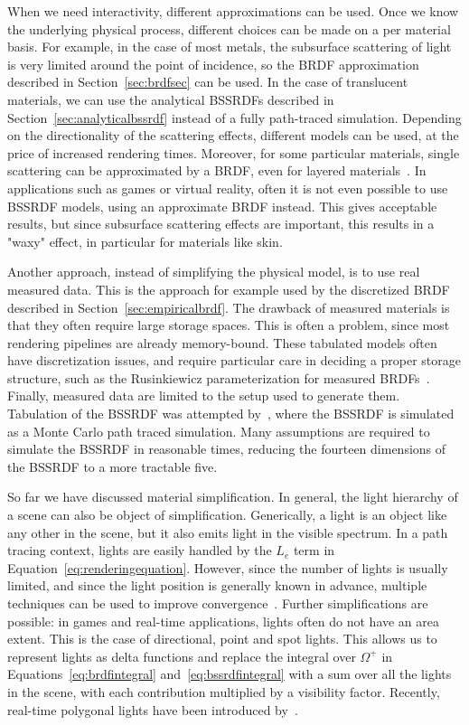 When we need interactivity, different approximations can be used. Once we know the underlying physical process, different choices can be made on a per material basis. For example, in the case of most metals, the subsurface scattering of light is very limited around the point of incidence, so the BRDF approximation described in Section~\ref{sec:brdfsec} can be used. In the case of translucent materials, we can use the analytical BSSRDFs described in Section~\ref{sec:analyticalbssrdf} instead of a fully path-traced simulation. Depending on the directionality of the scattering effects, different models can be used, at the price of increased rendering times. Moreover, for some particular materials, single scattering can be approximated by a BRDF, even for layered materials~\cite{Blinn1982, Hanrahan1993}. In applications such as games or virtual reality, often it is not even possible to use BSSRDF models, using an approximate BRDF instead. This gives acceptable results, but since subsurface scattering effects are important, this results in a "waxy" effect, in particular for materials like skin. 

Another approach, instead of simplifying the physical model, is to use real measured data. This is the approach for example used by the discretized BRDF described in Section~\ref{sec:empiricalbrdf}. The drawback of measured materials is that they often require large storage spaces. This is often a problem, since most rendering pipelines are already memory-bound. These tabulated models often have discretization issues, and require particular care in deciding a proper storage structure, such as the Rusinkiewicz parameterization for measured BRDFs~\cite{Rusinkiewicz1998}. Finally, measured data are limited to the setup used to generate them. Tabulation of the BSSRDF was attempted by~\citet{Donner2009}, where the BSSRDF is simulated as a Monte Carlo path traced simulation. Many assumptions are required to simulate the BSSRDF in reasonable times, reducing the fourteen dimensions of the BSSRDF to a more tractable five.  

So far we have discussed material simplification. In general, the light hierarchy of a scene can also be object of simplification. Generically, a light is an object like any other in the scene, but it also emits light in the visible spectrum. In a path tracing context, lights are easily handled by the $L_e$ term in Equation~\ref{eq:renderingequation}. However, since the number of lights is usually limited, and since the light position is generally known in advance, multiple techniques can be used to improve convergence~\cite{Shirley1996}. Further simplifications are possible: in games and real-time applications, lights often do not have an area extent. This is the case of directional, point and spot lights. This allows us to represent lights as delta functions and replace the integral over $\Omega^+$ in Equations~\ref{eq:brdfintegral} and~\ref{eq:bssrdfintegral} with a sum over all the lights in the scene, with each contribution multiplied by a visibility factor. Recently, real-time polygonal lights have been introduced by~\citet{Heitz2016}.


